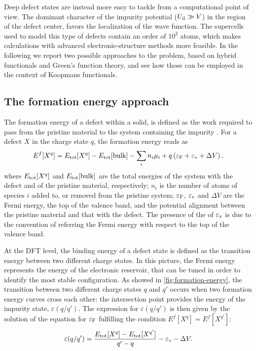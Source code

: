 Deep defect states are instead more easy to tackle from a computational point of view. The dominant character of the impurity potential ($U_{\rm d} \gg V$) in the region of the defect center, favors the localization of the wave function. The supercells used to model this type of defects contain an order of $10^2$ atoms, which makes calculations with advanced electronic-structure methods more feasible. In the following we report two possible approaches to the problem, based on hybrid functionals and Green's function theory, and see how those can be employed in the context of Koopmans functionals.

\subsection{The formation energy approach}
The formation energy of a defect within a solid, is defined as the work required to pass from the pristine material to the system containing the impurity \cite{van_de_walle_first-principles_2004}. For a defect $X$ in the charge state $q$, the formation energy reads as
%
\begin{equation}
    E^f[{X^q}] = E_{\rm tot}[X^q] - E_{\rm tot}[{\rm bulk}] - \sum_i n_i \mu_i + q \left( \varepsilon_{\rm F} + \varepsilon_{\rm v} + \Delta V \right) ,
    \label{eq:formation-energy}
\end{equation}
%
where $E_{\rm tot}[X^q]$ and $E_{\rm tot}[{\rm bulk}]$ are the total energies of the system with the defect and of the pristine material, respectively; $n_i$ is the number of atoms of species $i$ added to, or removed from the pristine system; $\varepsilon_{\rm F}$, $\varepsilon_{\rm v}$ and $\Delta V$ are the Fermi energy, the top of the valence band, and the potential alignment between the pristine material and that with the defect. The presence of the of $\varepsilon_{\rm v}$ is due to the convention of referring the Fermi energy with respect to the top of the valence band.

At the DFT level, the binding energy of a defect state is defined as the transition energy between two different charge states. In this picture, the Fermi energy represents the energy of the electronic reservoir, that can be tuned in order to identify the most stable configuration. As showed in \cref{fig:formation-energy}, the transition between two different charge states $q$ and $q'$ occurs when two formation energy curves cross each other: the intersection point provides the energy of the impurity state, $\varepsilon(q/q')$. The expression for $\varepsilon(q/q')$ is then given by the solution of the equation for $\varepsilon_{\rm F}$ fulfilling the condition $E^f[X^q]=E^f[X^{q'}]$:
%
\begin{equation}
    \varepsilon(q/q') = \frac{E_{\rm tot}[X^q] - E_{\rm tot}[X^{q'}]}{q' - q} -\varepsilon_{\rm v} - \Delta V .
    \label{eq:energy-defect-level}
\end{equation}

